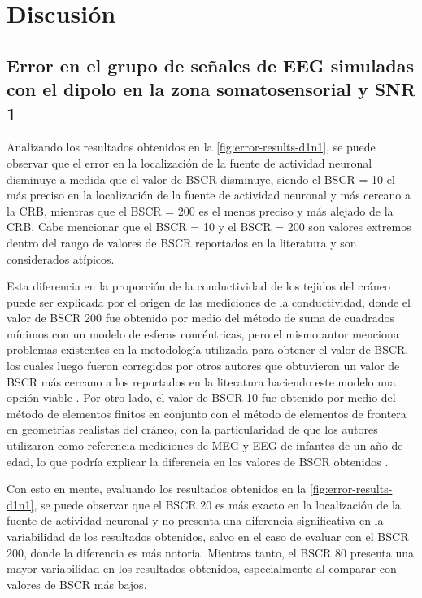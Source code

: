 %
\chapter{Discusión}
\label{sec:discusion}

\section{Error en el grupo de señales de EEG simuladas con
el dipolo en la zona somatosensorial y SNR 1}
\label{sec:discusion:d1n1}

Analizando los resultados obtenidos en la \cref{fig:error-results-d1n1}, se puede observar que el error en la localización de la fuente de actividad neuronal disminuye a medida que el valor de BSCR disminuye, siendo el BSCR = 10 el más preciso en la localización de la fuente de actividad neuronal y más cercano a la CRB, mientras que el BSCR = 200 es el menos preciso y más alejado de la CRB.
Cabe mencionar que el BSCR = 10 y el BSCR = 200 son valores extremos dentro del rango de valores de BSCR reportados en la literatura y son considerados atípicos. 

Esta diferencia en la proporción de la conductividad de los tejidos del cráneo puede ser explicada por el origen de las mediciones de la conductividad, donde el valor de BSCR 200 fue obtenido por medio del método de suma de cuadrados mínimos con un modelo de esferas concéntricas, pero el mismo autor menciona problemas existentes en la metodología utilizada para obtener el valor de BSCR, los cuales luego fueron corregidos por otros autores que obtuvieron un valor de BSCR más cercano a los reportados en la literatura haciendo este modelo una opción viable \cite{eriksenVivoHumanHead1990, Gutierrez2004}. 
Por otro lado, el valor de BSCR 10 fue obtenido por medio del método de elementos finitos en conjunto con el método de elementos de frontera en geometrías realistas del cráneo, con la particularidad de que los autores utilizaron como referencia mediciones de MEG y EEG de infantes de un año de edad, lo que podría explicar la diferencia en los valores de BSCR obtenidos \cite{acarHighresolutionEEGSource2016}.

Con esto en mente, evaluando los resultados obtenidos en la \cref{fig:error-results-d1n1}, se puede observar que el BSCR 20 es más exacto en la localización de la fuente de actividad neuronal y no presenta una diferencia significativa en la variabilidad de los resultados obtenidos, salvo en el caso de evaluar con el BSCR 200, donde la diferencia es más notoria. 
Mientras tanto, el BSCR 80 presenta una mayor variabilidad en los resultados obtenidos, especialmente al comparar con valores de BSCR más bajos.  


